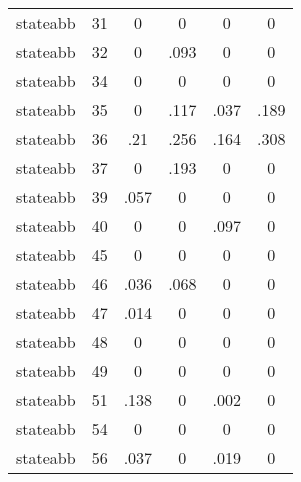 \begin{table}[htbp]
\begin{tabular}{l*{5}{c}}
stateabb    &          31&           0&           0&           0&           0\\
stateabb    &          32&           0&        .093&           0&           0\\
stateabb    &          34&           0&           0&           0&           0\\
stateabb    &          35&           0&        .117&        .037&        .189\\
stateabb    &          36&         .21&        .256&        .164&        .308\\
stateabb    &          37&           0&        .193&           0&           0\\
stateabb    &          39&        .057&           0&           0&           0\\
stateabb    &          40&           0&           0&        .097&           0\\
stateabb    &          45&           0&           0&           0&           0\\
stateabb    &          46&        .036&        .068&           0&           0\\
stateabb    &          47&        .014&           0&           0&           0\\
stateabb    &          48&           0&           0&           0&           0\\
stateabb    &          49&           0&           0&           0&           0\\
stateabb    &          51&        .138&           0&        .002&           0\\
stateabb    &          54&           0&           0&           0&           0\\
stateabb    &          56&        .037&           0&        .019&           0\\
\bottomrule
\end{tabular}
\end{table}
